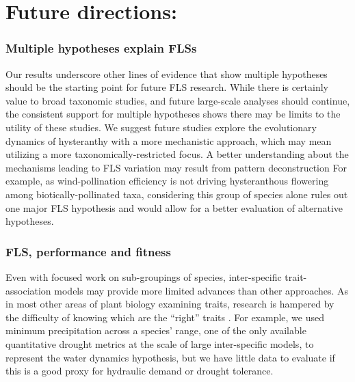 \documentclass[11pt]{article}
\begin{document}
\section*{Future directions:}
\subsubsection*{Multiple hypotheses explain FLSs}
\noindent Our results underscore other lines of evidence that show multiple hypotheses should be the starting point for future FLS research. While there is certainly value to broad taxonomic studies, and future large-scale analyses should continue, the consistent support for multiple hypotheses shows there may be limits to the utility of these studies. We suggest future studies explore the evolutionary dynamics of hysteranthy with a more mechanistic approach, which may mean utilizing a more taxonomically-restricted focus. A better understanding about the mechanisms leading to FLS variation may result from pattern deconstruction \citep[i.e. grouping of species according to trait commonalities or their geographic or phylogenetic distributions,][]{Terribile2009} For example, as wind-pollination efficiency is not driving hysteranthous flowering among biotically-pollinated taxa, considering this group of species alone rules out one major FLS hypothesis and would allow for a better evaluation of alternative hypotheses.

\subsubsection*{FLS, performance and fitness}
Even with focused work on sub-groupings of species, inter-specific trait-association models may provide more limited advances than other approaches. As in most other areas of plant biology examining traits, research is hampered by the difficulty of knowing which are the ``right'' traits \citep{Violle2007}. For example, we used minimum precipitation across a species' range, one of the only available quantitative drought metrics at the scale of large inter-specific models, to represent the water dynamics hypothesis, but we have little data to evaluate if this is a good proxy for hydraulic demand or drought tolerance. \\
\end{document}
